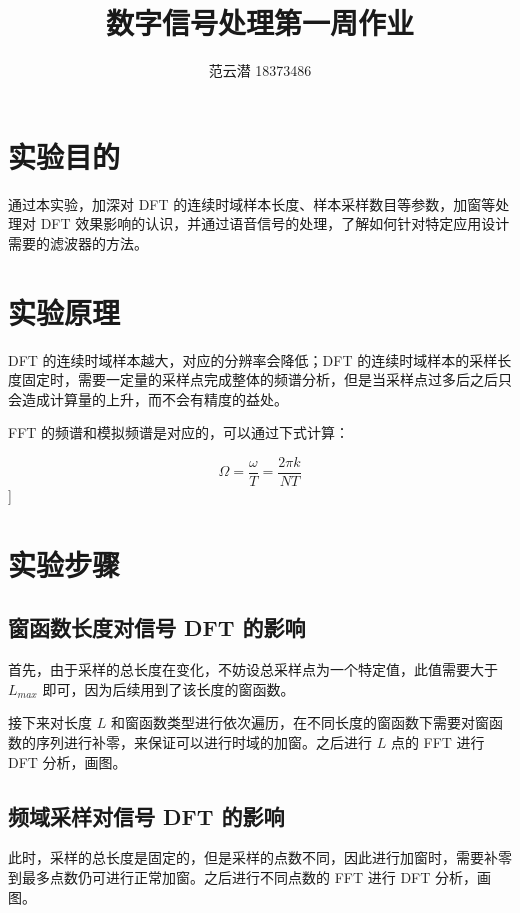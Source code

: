 \documentclass[lang=cn,11pt,a4paper,cite=authoryear]{elegantpaper}
\title{数字信号处理\quad 第一周作业}
\author{范云潜 18373486}
\institute{微电子学院 184111 班}
\date{\zhtoday}
\begin{document}
\maketitle

\tableofcontents

\listoffigures


\section{实验目的}

通过本实验，加深对 DFT 的连续时域样本长度、样本采样数目等参数，加窗等处理对 DFT 效果影响的认识，并通过语音信号的处理，了解如何针对特定应用设计需要的滤波器的方法。

\section{实验原理}

DFT 的连续时域样本越大，对应的分辨率会降低；DFT 的连续时域样本的采样长度固定时，需要一定量的采样点完成整体的频谱分析，但是当采样点过多后之后只会造成计算量的上升，而不会有精度的益处。

FFT 的频谱和模拟频谱是对应的，可以通过下式计算：

\[\Omega = \frac{\omega}{T} = \frac{2\pi k}{N T}\]]

\section{实验步骤}

\subsection{窗函数长度对信号 DFT 的影响}

首先，由于采样的总长度在变化，不妨设总采样点为一个特定值，此值需要大于 \(L_{max}\) 即可，因为后续用到了该长度的窗函数。

接下来对长度 \(L\) 和窗函数类型进行依次遍历，在不同长度的窗函数下需要对窗函数的序列进行补零，来保证可以进行时域的加窗。之后进行 \(L\) 点的 FFT 进行 DFT 分析，画图。

\subsection{频域采样对信号 DFT 的影响}

此时，采样的总长度是固定的，但是采样的点数不同，因此进行加窗时，需要补零到最多点数仍可进行正常加窗。之后进行不同点数的 FFT 进行 DFT 分析，画图。
\end{document}
